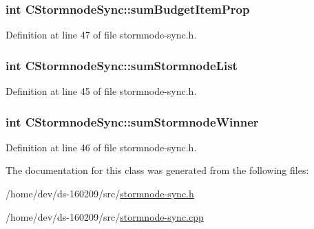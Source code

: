 \subsubsection[{sum\+Budget\+Item\+Prop}]{\setlength{\rightskip}{0pt plus 5cm}int C\+Stormnode\+Sync\+::sum\+Budget\+Item\+Prop}\label{class_c_stormnode_sync_a04a5e8c869c0b3802ce5ab2b8d0c7952}


Definition at line 47 of file stormnode-\/sync.\+h.

\hypertarget{class_c_stormnode_sync_a3049bd8c09a2b946e99bb1ffca5ebd97}{}
\subsubsection[{sum\+Stormnode\+List}]{\setlength{\rightskip}{0pt plus 5cm}int C\+Stormnode\+Sync\+::sum\+Stormnode\+List}\label{class_c_stormnode_sync_a3049bd8c09a2b946e99bb1ffca5ebd97}


Definition at line 45 of file stormnode-\/sync.\+h.

\hypertarget{class_c_stormnode_sync_a37b84e2f05256e44f9d0c80a87b26895}{}
\subsubsection[{sum\+Stormnode\+Winner}]{\setlength{\rightskip}{0pt plus 5cm}int C\+Stormnode\+Sync\+::sum\+Stormnode\+Winner}\label{class_c_stormnode_sync_a37b84e2f05256e44f9d0c80a87b26895}


Definition at line 46 of file stormnode-\/sync.\+h.



The documentation for this class was generated from the following files\+:\begin{DoxyCompactItemize}
\item 
/home/dev/ds-\/160209/src/\hyperlink{stormnode-sync_8h}{stormnode-\/sync.\+h}\item 
/home/dev/ds-\/160209/src/\hyperlink{stormnode-sync_8cpp}{stormnode-\/sync.\+cpp}\end{DoxyCompactItemize}
